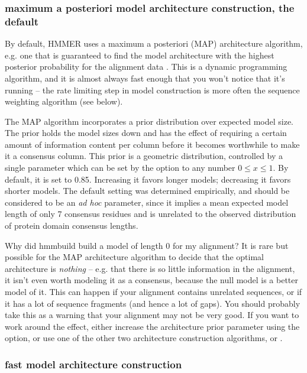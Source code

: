 \subsubsection{maximum a posteriori model architecture construction, the default}

By default, HMMER uses a maximum a posteriori (MAP) architecture
algorithm, e.g. one that is guaranteed to find the model architecture
with the highest posterior probability for the alignment data
\cite{Durbin98}.  This is a dynamic programming algorithm, and it is
almost always fast enough that you won't notice that it's running --
the rate limiting step in model construction is more often the
sequence weighting algorithm (see below). 

The MAP algorithm incorporates a prior distribution over expected
model size. The prior holds the model sizes down and has the effect of
requiring a certain amount of information content per column before it
becomes worthwhile to make it a consensus column. This prior is a
geometric distribution, controlled by a single parameter which can be
set by the  option to any number $0 \leq x \leq
1$. By default, it is set to 0.85. Increasing it favors longer models;
decreasing it favors shorter models. The default setting was
determined empirically, and should be considered to be an \emph{ad
hoc} parameter, since it implies a mean expected model length of only
7 consensus residues and is unrelated to the observed distribution of
protein domain consensus lengths.

\begin{srefaq}{Why did hmmbuild build a model of length 0 for my alignment?}
It is rare but possible for the MAP architecture algorithm to decide
that the optimal architecture is \emph{nothing} -- e.g. that there is
so little information in the alignment, it isn't even worth modeling
it as a consensus, because the null model is a better model of
it. This can happen if your alignment contains unrelated sequences, or
if it has a lot of sequence fragments (and hence a lot of gaps). You
should probably take this as a warning that your alignment may not be
very good. If you want to work around the effect, either increase the
architecture prior parameter using the  option, or use
one of the other two architecture construction algorithms,
 or .
\end{srefaq}

\subsubsection{fast model architecture construction}

